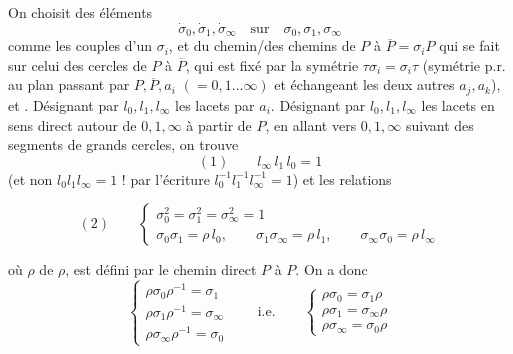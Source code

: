 \documentclass[11pt,a4paper]{article}
\begin{document}

On choisit des éléments
\[
\dot\sigma_0, \dot\sigma_1, \dot\sigma_\infty \quad \text{sur} \quad
\sigma_0, \sigma_1, \sigma_\infty
\]
comme les couples d'un $\sigma_i$, et du chemin/des chemins de
$P$ à $\overline{P} = \sigma_i P$ qui se fait sur \struck{\ill{}} celui des
 cercles de $P$ à $\overline{P}$, \struck{\ill{}} qui est
fixé par la symétrie $\tau\sigma_i = \sigma_i\tau$ (symétrie p.r. au plan
passant par $P, \overline{P}, a_i$ $(= 0, 1 \ldots \infty)$ et échangeant les
deux autres $a_j, a_k$), et  \ill{} .
\struck{\ill{}} Désignant par $l_0, l_1, l_\infty$ les lacets \struck{\ill{}}
par $a_i$. Désignant par $l_0, l_1, l_\infty$ les lacets en sens direct autour
de $0, 1, \infty$ à partir de $P$, en allant vers $0, 1, \infty$ suivant des
segments de grands cercles, on trouve
\[
(1) \qquad l_\infty\, l_1\, l_0 = 1
\]
(et non $l_0 l_1 l_\infty = 1$ !  par l'écriture
$l_0^{-1} l_1^{-1} l_\infty^{-1} = 1$) et les relations



\[
(2) \qquad
\begin{cases}
\sigma_0^2 = \sigma_1^2 = \sigma_\infty^2 = 1 \\
\sigma_0\sigma_1 = \rho\, l_0, \qquad \sigma_1\sigma_\infty = \rho\, l_1, \qquad \sigma_\infty\sigma_0 = \rho\, l_\infty
\end{cases}
\]


où $\rho$  de $\rho$, est défini par le chemin
direct  $P$ à $P$. On a donc
\[
\begin{cases}
\rho\sigma_0\rho^{-1} = \sigma_1 \\
\rho\sigma_1\rho^{-1} = \sigma_\infty \\
\rho\sigma_\infty\rho^{-1} = \sigma_0
\end{cases}
\qquad \text{i.e.} \qquad
\begin{cases}
\rho\sigma_0 = \sigma_1\rho \\
\rho\sigma_1 = \sigma_\infty\rho \\
\rho\sigma_\infty = \sigma_0\rho
\end{cases}
\]
\end{document}
